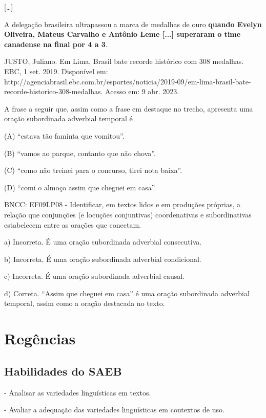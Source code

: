 \begin{itemize}
\begin{itemize}
{\begin{itemize}
\begin{itemize}
{[}\ldots{}{]}

A delegação brasileira ultrapassou a marca de medalhas de ouro
\textbf{quando Evelyn Oliveira, Mateus Carvalho e Antônio Leme {[}...{]}
superaram o time canadense na final por 4 a 3}.

JUSTO, Juliano. Em Lima, Brasil bate recorde histórico com 308 medalhas.
EBC, 1 set. 2019. Disponível em:
http://agenciabrasil.ebc.com.br/esportes/noticia/2019-09/em-lima-brasil-bate-recorde-historico-308-medalhas.
Acesso em: 9 abr. 2023.

A frase a seguir que, assim como a frase em destaque no trecho,
apresenta uma oração subordinada adverbial temporal é

(A) ``estava tão faminta que vomitou''.

(B) ``vamos ao parque, contanto que não chova''.

(C) ``como não treinei para o concurso, tirei nota baixa''.

(D) ``comi o almoço assim que cheguei em casa''.

BNCC: EF09LP08 - Identificar, em textos lidos e em produções próprias, a
relação que conjunções (e locuções conjuntivas) coordenativas e
subordinativas estabelecem entre as orações que conectam.

a) Incorreta. É uma oração subordinada adverbial consecutiva.

b) Incorreta. É uma oração subordinada adverbial condicional.

c) Incorreta. É uma oração subordinada adverbial causal.

d) Correta. ``Assim que cheguei em casa'' é uma oração subordinada
adverbial temporal, assim como a oração destacada no texto.

\chapter{Regências}

\section{Habilidades do SAEB}

- Analisar as variedades linguísticas em textos.

- Avaliar a adequação das variedades linguísticas em contextos de uso.

\end{itemize}
\end{itemize}}
\end{itemize}
\end{itemize}
